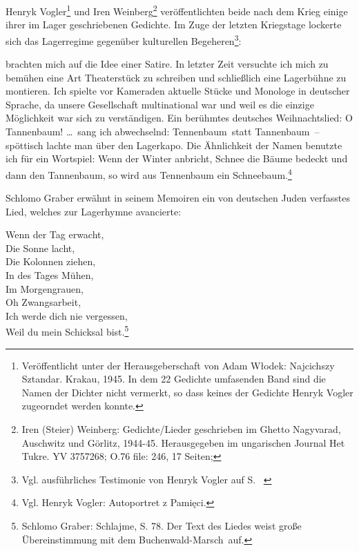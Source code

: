 \documentclass[a4paper,12pt,ngerman,
]{nisebook}
\begin{document}
Henryk Vogler\footnote{Veröffentlicht unter der Herausgeberschaft von Adam W\l odek: Najcichszy Sztandar. Krakau, 1945. In dem 22 Gedichte umfasenden Band sind die Namen der Dichter nicht vermerkt, so dass keines der Gedichte Henryk Vogler zugeorndet werden konnte.} und Iren Weinberg\footnote{Iren (Steier) Weinberg: Gedichte/Lieder geschrieben im Ghetto Nagyvarad, Auschwitz und Görlitz, 1944-45. Herausgegeben im ungarischen Journal \glqq Het Tukre\grqq. YV 3757268; O.76 file: 246, 17 Seiten;} veröffentlichten beide nach dem Krieg einige ihrer im Lager geschriebenen Gedichte. Im Zuge der letzten Kriegstage lockerte sich das Lagerregime gegenüber kulturellen Begeheren\footnote{Vgl. ausführliches Testimonie von Henryk Vogler auf S. ~\pageref{vogler}}:
\begin{leftbar}
 brachten mich auf die Idee einer Satire. In letzter Zeit versuchte ich mich zu bemühen eine Art Theaterstück zu schreiben und schließlich eine Lagerbühne zu montieren. Ich spielte vor Kameraden aktuelle Stücke und Monologe in deutscher Sprache, da unsere Gesellschaft multinational war und weil es die einzige Möglichkeit war sich zu verständigen. Ein berühmtes deutsches Weihnachtslied: \glqq O Tannenbaum! \dots\grqq~sang ich abwechselnd: \glqq Tennenbaum\grqq~statt \glqq Tannenbaum\grqq~--spöttisch lachte man über den Lagerkapo. Die Ähnlichkeit der Namen benutzte ich für ein Wortspiel: Wenn der Winter anbricht, Schnee die Bäume bedeckt und dann den Tannenbaum, so wird aus Tennenbaum ein Schneebaum.\footnote{Vgl. Henryk Vogler: Autoportret z Pamięci.}
\end{leftbar}

Schlomo Graber erwähnt in seinem Memoiren ein von deutschen Juden verfasstes Lied, welches zur Lagerhymne avancierte:
\begin{leftbar}
Wenn der Tag erwacht,\\
Die Sonne lacht,\\
Die Kolonnen ziehen,\\
In des Tages Mühen,\\
Im Morgengrauen,\\
Oh Zwangsarbeit,\\
Ich werde dich nie vergessen,\\
Weil du mein Schicksal bist.\footnote{Schlomo Graber: Schlajme, S. 78. Der Text des Liedes weist große Übereinstimmung mit dem \glqq Buchenwald-Marsch\grqq~auf.}
\end{leftbar}
\end{document}
